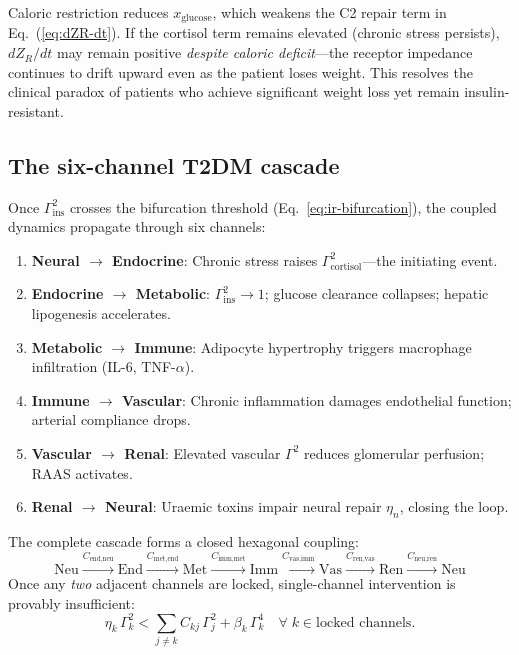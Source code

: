 \documentclass[aps,pre,twocolumn,superscriptaddress,floatfix]{revtex4-2}
\begin{document}
\begin{remark}
\label{rem:diet-alone}
Caloric restriction reduces $x_{\text{glucose}}$,
which weakens the C2 repair term in
Eq.~(\ref{eq:dZR-dt}).
If the cortisol term remains elevated (chronic
stress persists), $dZ_R/dt$ may remain positive
\emph{despite caloric deficit}---the receptor
impedance continues to drift upward even as the
patient loses weight.
This resolves the clinical paradox of patients who
achieve significant weight loss yet remain
insulin-resistant.
\end{remark}


\subsection{The six-channel T2DM cascade}
\label{sec:t2d-six-channel}

Once $\Gamma_{\text{ins}}^2$ crosses the bifurcation
threshold (Eq.~\ref{eq:ir-bifurcation}), the coupled
dynamics propagate through six channels:

\begin{enumerate}
  \item \textbf{Neural $\to$ Endocrine}:
    Chronic stress raises
    $\Gamma_{\text{cortisol}}^2$---the initiating
    event.
  \item \textbf{Endocrine $\to$ Metabolic}:
    $\Gamma_{\text{ins}}^2 \to 1$; glucose
    clearance collapses; hepatic lipogenesis
    accelerates.
  \item \textbf{Metabolic $\to$ Immune}:
    Adipocyte hypertrophy triggers macrophage
    infiltration (IL-6, TNF-$\alpha$).
  \item \textbf{Immune $\to$ Vascular}:
    Chronic inflammation damages endothelial
    function; arterial compliance drops.
  \item \textbf{Vascular $\to$ Renal}:
    Elevated vascular $\Gamma^2$ reduces glomerular
    perfusion; RAAS activates.
  \item \textbf{Renal $\to$ Neural}:
    Uraemic toxins impair neural repair $\eta_n$,
    closing the loop.
\end{enumerate}

The complete cascade forms a closed hexagonal
coupling:
\begin{equation}
  \text{Neu}\!\xrightarrow{C_{\text{end,neu}}}
  \!\text{End}\!\xrightarrow{C_{\text{met,end}}}
  \!\text{Met}\!\xrightarrow{C_{\text{imm,met}}}
  \!\text{Imm}\!\xrightarrow{C_{\text{vas,imm}}}
  \!\text{Vas}\!\xrightarrow{C_{\text{ren,vas}}}
  \!\text{Ren}\!\xrightarrow{C_{\text{neu,ren}}}
  \!\text{Neu}
  \label{eq:t2d-hexagon}
\end{equation}
Once any \emph{two} adjacent channels are locked,
single-channel intervention is provably
insufficient:
\begin{equation}
  \eta_k\,\Gamma_k^2
  < \sum_{j \neq k} C_{kj}\,\Gamma_j^2
    + \beta_k\,\Gamma_k^4
  \quad \forall\; k \in
  \text{locked channels.}
  \label{eq:t2d-irreversible}
\end{equation}
\end{document}
